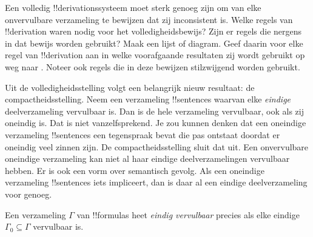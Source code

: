 \documentclass[openany]{memoir}
\begin{document}
\begin{prob}
Een volledig !!{derivation}ssysteem moet sterk genoeg zijn om van elke
onvervulbare verzameling te bewijzen dat zij inconsistent is. Welke
regels van !!{derivation} waren nodig voor het volledigheidsbewijs? Zijn
er regels die nergens in dat bewijs worden gebruikt? Maak een lijst of
diagram. Geef daarin voor elke regel van !!{derivation} aan in welke
voorafgaande resultaten zij wordt gebruikt op weg naar
. Noteer ook regels die in deze
bewijzen stilzwijgend worden gebruikt.
\end{prob}
\tagendprob
\endgroup

\begingroup
\def\olfilename{OLP-0135}
\def\olfilepath{content/first-order-logic/completeness/}
\hypertarget{unit-OLP-0135}{}



      {}
      {}


Uit de volledigheidsstelling volgt een belangrijk nieuw resultaat: de
compactheidsstelling. Neem een verzameling !!{sentence}s waarvan elke
\emph{eindige} deelverzameling vervulbaar is. Dan is de hele verzameling
vervulbaar, ook als zij oneindig is. Dat is niet vanzelfsprekend. Je zou
kunnen denken dat een oneindige verzameling !!{sentence}s een tegenspraak
bevat die pas ontstaat doordat er oneindig veel zinnen zijn. De
compactheidsstelling sluit dat uit. Een onvervulbare oneindige
verzameling kan niet al haar eindige deelverzamelingen vervulbaar hebben.
Er is ook een vorm over semantisch gevolg. Als een oneindige verzameling
!!{sentence}s iets impliceert, dan is daar al een eindige deelverzameling
voor genoeg.

\begin{defn}
  Een verzameling $\Gamma$ van !!{formula}s heet \emph{eindig
  vervulbaar} precies als elke eindige $\Gamma_0 \subseteq \Gamma$
  vervulbaar is.
\end{defn}
\end{document}
